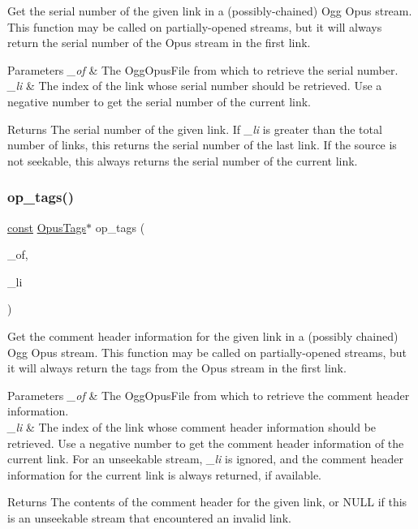 Get the serial number of the given link in a (possibly-\/chained) Ogg Opus stream. This function may be called on partially-\/opened streams, but it will always return the serial number of the Opus stream in the first link. 
\begin{DoxyParams}{Parameters}
{\em \+\_\+of} & The {\ttfamily Ogg\+Opus\+File} from which to retrieve the serial number. \\
\hline
{\em \+\_\+li} & The index of the link whose serial number should be retrieved. Use a negative number to get the serial number of the current link. \\
\hline
\end{DoxyParams}
\begin{DoxyReturn}{Returns}
The serial number of the given link. If {\itshape \+\_\+li} is greater than the total number of links, this returns the serial number of the last link. If the source is not seekable, this always returns the serial number of the current link. 
\end{DoxyReturn}
\mbox{\label{group__stream__info_ga4b9b8b62a9fb04aee64c288e106a4822}} 
\subsubsection{\texorpdfstring{op\+\_\+tags()}{op\_tags()}}
{\footnotesize\ttfamily \hyperlink{zconf_8h_a2c212835823e3c54a8ab6d95c652660e}{const} \hyperlink{struct_opus_tags}{Opus\+Tags}$\ast$ op\+\_\+tags (\begin{DoxyParamCaption}\item[{\hyperlink{zconf_8h_a2c212835823e3c54a8ab6d95c652660e}{const} Ogg\+Opus\+File $\ast$}]{\+\_\+of,  }\item[{int}]{\+\_\+li }\end{DoxyParamCaption})}

Get the comment header information for the given link in a (possibly chained) Ogg Opus stream. This function may be called on partially-\/opened streams, but it will always return the tags from the Opus stream in the first link. 
\begin{DoxyParams}{Parameters}
{\em \+\_\+of} & The {\ttfamily Ogg\+Opus\+File} from which to retrieve the comment header information. \\
\hline
{\em \+\_\+li} & The index of the link whose comment header information should be retrieved. Use a negative number to get the comment header information of the current link. For an unseekable stream, {\itshape \+\_\+li} is ignored, and the comment header information for the current link is always returned, if available. \\
\hline
\end{DoxyParams}
\begin{DoxyReturn}{Returns}
The contents of the comment header for the given link, or {\ttfamily N\+U\+LL} if this is an unseekable stream that encountered an invalid link. 
\end{DoxyReturn}
